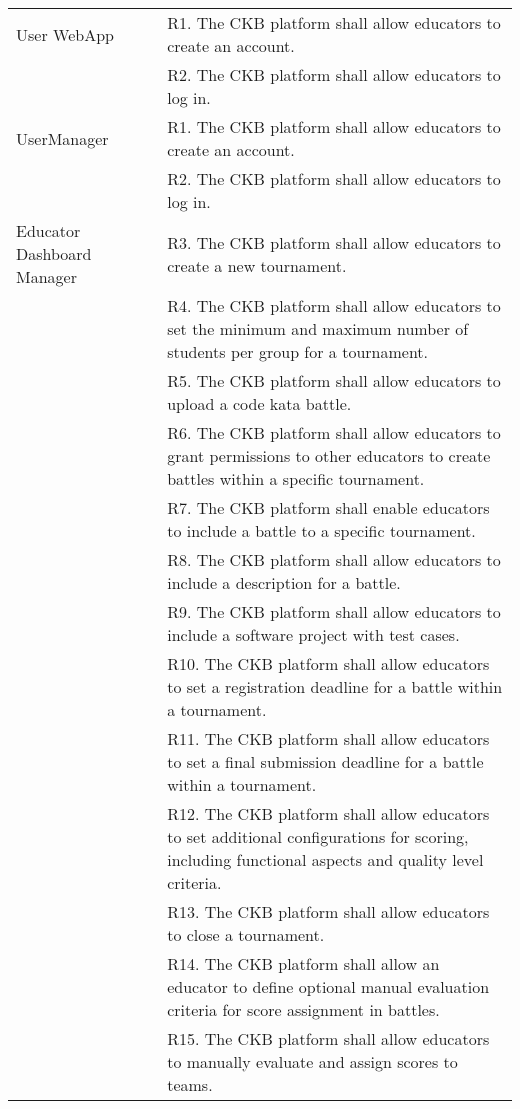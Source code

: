 \begin{center}
    \begin{longtable}{p{0.3\linewidth}p{0.7\linewidth}}
        \hline
        User WebApp & R1. The CKB platform shall allow educators to create an account. \\
        & R2. The CKB platform shall allow educators to log in. \\
        \hline
        UserManager & R1. The CKB platform shall allow educators to create an account. \\
        & R2. The CKB platform shall allow educators to log in. \\
        \hline
        Educator Dashboard Manager & R3. The CKB platform shall allow educators to create a new tournament. \\
        & R4. The CKB platform shall allow educators to set the minimum and maximum number of students per group for a tournament. \\
        & R5. The CKB platform shall allow educators to upload a code kata battle. \\
        & R6. The CKB platform shall allow educators to grant permissions to other educators to create battles within a specific tournament. \\
        & R7. The CKB platform shall enable educators to include a battle to a specific tournament. \\
        & R8. The CKB platform shall allow educators to include a description for a battle. \\
        & R9. The CKB platform shall allow educators to include a software project with test cases. \\
        & R10. The CKB platform shall allow educators to set a registration deadline for a battle within a tournament. \\
        & R11. The CKB platform shall allow educators to set a final submission deadline for a battle within a tournament. \\
        & R12. The CKB platform shall allow educators to set additional configurations for scoring, including functional aspects and quality level criteria. \\
        & R13. The CKB platform shall allow educators to close a tournament. \\
        & R14. The CKB platform shall allow an educator to define optional manual evaluation criteria for score assignment in battles. \\
        & R15. The CKB platform shall allow educators to manually evaluate and assign scores to teams. \\

\end{longtable}
\end{center}
